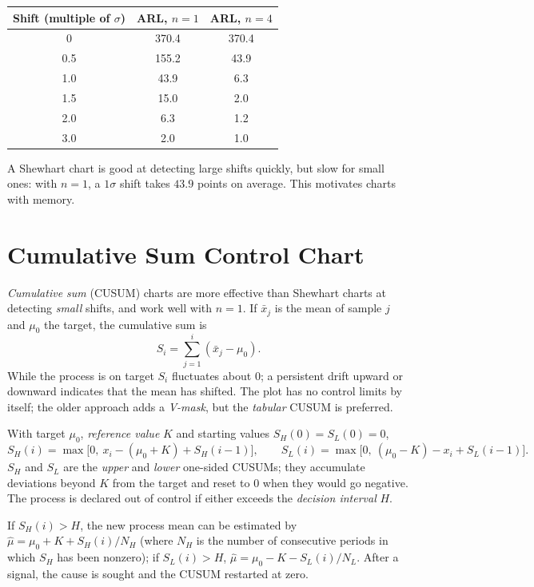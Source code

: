 \begin{center}
\begin{tabular}{c|cc}
\toprule
Shift (multiple of $\sigma$) & ARL, $n=1$ & ARL, $n=4$\\
\midrule
0 & 370.4 & 370.4\\
0.5 & 155.2 & 43.9\\
1.0 & 43.9 & 6.3\\
1.5 & 15.0 & 2.0\\
2.0 & 6.3 & 1.2\\
3.0 & 2.0 & 1.0\\
\bottomrule
\end{tabular}
\end{center}

A Shewhart chart is good at detecting large shifts quickly, but slow for small ones: with $n=1$, a $1\sigma$ shift takes $43.9$ points on average. This motivates charts with memory.

\section{Cumulative Sum Control Chart}\label{sec:cusum}

\emph{Cumulative sum} (CUSUM) charts are more effective than Shewhart charts at detecting \emph{small} shifts, and work well with $n=1$. If $\bar{x}_j$ is the mean of sample $j$ and $\mu_0$ the target, the cumulative sum is
\[ S_i=\sum_{j=1}^i(\bar{x}_j-\mu_0). \]
While the process is on target $S_i$ fluctuates about $0$; a persistent drift upward or downward indicates that the mean has shifted. The plot has no control limits by itself; the older approach adds a \emph{V-mask}, but the \emph{tabular} CUSUM is preferred.

\begin{definition}
With target $\mu_0$, \emph{reference value} $K$ and starting values $S_H(0)=S_L(0)=0$,
\[ S_H(i)=\max\big[0,\ x_i-(\mu_0+K)+S_H(i-1)\big],\qquad S_L(i)=\max\big[0,\ (\mu_0-K)-x_i+S_L(i-1)\big]. \]
$S_H$ and $S_L$ are the \emph{upper} and \emph{lower} one-sided CUSUMs; they accumulate deviations beyond $K$ from the target and reset to $0$ when they would go negative. The process is declared out of control if either exceeds the \emph{decision interval} $H$.
\end{definition}

If $S_H(i)>H$, the new process mean can be estimated by $\hat\mu=\mu_0+K+S_H(i)/N_H$ (where $N_H$ is the number of consecutive periods in which $S_H$ has been nonzero); if $S_L(i)>H$, $\hat\mu=\mu_0-K-S_L(i)/N_L$. After a signal, the cause is sought and the CUSUM restarted at zero.

